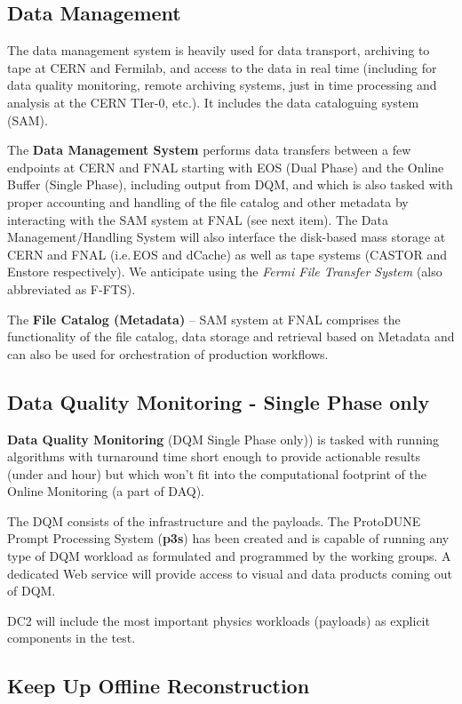 \documentclass[pdftex,12pt,letter]{article}
\newcommand{\singp}{Single Phase\xspace}
\newcommand{\dualp}{Dual Phase\xspace}
\begin{document}
\subsection{Data Management}
The data management system is heavily used for data transport, archiving to tape at CERN and Fermilab, and access to the data in real time (including for data quality monitoring, remote archiving systems,  just in time processing and analysis at the CERN TIer-0, etc.). It includes the data cataloguing system (SAM).

The \textbf{Data Management System}\cite{docdb1212}  performs data transfers between a few endpoints
at CERN and FNAL starting with EOS (\dualp) and the Online Buffer (\singp), including output from DQM,  and which is also tasked with proper accounting and handling of the file catalog and other metadata
by interacting with the SAM system at FNAL (see next item). The Data Management/Handling System will also interface the disk-based mass storage
at CERN and FNAL (i.e.\,EOS\cite{eos} and dCache) as well as tape systems (CASTOR and Enstore respectively).
We anticipate using the \textit{Fermi File Transfer System} (also abbreviated as F-FTS\cite{fts}).

The \textbf{File Catalog (Metadata)}  -- SAM system at FNAL comprises the functionality of the file catalog, data storage and
retrieval based on Metadata and can also be used for orchestration of production workflows.

\subsection{Data Quality Monitoring - Single Phase only}

\textbf{Data Quality Monitoring} (DQM \singp only))  is tasked with running algorithms with turnaround time short enough to provide
actionable results (under and hour) but which won't fit into the computational footprint of the Online Monitoring (a part of DAQ).

The DQM consists of the infrastructure and the payloads. The ProtoDUNE Prompt Processing System (\textbf{p3s}) \cite{docdb1811,p3s}  has been created and
is capable of running any type of DQM workload as formulated and programmed by the working groups. A dedicated Web
service will provide access to visual and data products coming out of DQM.

DC2 will include the most important physics workloads (payloads) as explicit components in the test.

\subsection{Keep Up Offline Reconstruction}
\end{document}
